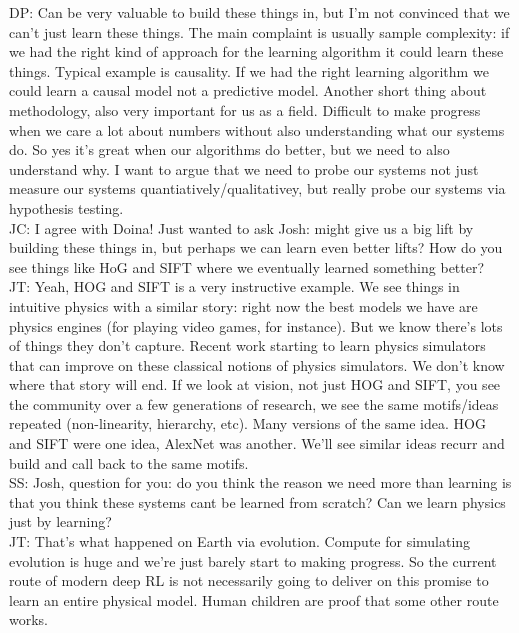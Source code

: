 DP: Can be very valuable to build these things in, but I'm not convinced that we can't just learn these things. The main complaint is usually sample complexity: if we had the right kind of approach for the learning algorithm it could learn these things. Typical example is causality. If we had the right learning algorithm we could learn a causal model not a predictive model. Another short thing about methodology, also very important for us as a field. Difficult to make progress when we care a lot about numbers without also understanding what our systems do. So yes it's great when our algorithms do better, but we need to also understand why. I want to argue that we need to probe our systems not just measure our systems quantiatively/qualitativey, but really probe our systems via hypothesis testing. \\

JC: I agree with Doina! Just wanted to ask Josh: might give us a big lift by building these things in, but perhaps we can learn even better lifts? How do you see things like HoG and SIFT where we eventually learned something better? \\

JT: Yeah, HOG and SIFT is a very instructive example. We see things in intuitive physics with a similar story: right now the best models we have are physics engines (for playing video games, for instance). But we know there's lots of things they don't capture. Recent work starting to learn physics simulators that can improve on these classical notions of physics simulators. We don't know where that story will end. If we look at vision, not just HOG and SIFT, you see the community over a few generations of research, we see the same motifs/ideas repeated (non-linearity, hierarchy, etc). Many versions of the same idea. HOG and SIFT were one idea, AlexNet was another. We'll see similar ideas recurr and build and call back to the same motifs. \\

SS: Josh, question for you: do you think the reason we need more than learning is that you think these systems cant be learned from scratch? Can we learn physics just by learning? \\

JT: That's what happened on Earth via evolution. Compute for simulating evolution is huge and we're just barely start to making progress. So the current route of modern deep RL is not necessarily going to deliver on this promise to learn an entire physical model. Human children are proof that some other route works. \\

